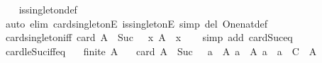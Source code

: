 \begin{isabellebody}
%
\isadelimproof
\ \ %
\endisadelimproof
%
\isatagproof
{}\isamarkupfalse%
\ is{\isacharunderscore}{\kern0pt}singleton{\isacharunderscore}{\kern0pt}def\isanewline
\ \ \isamarkupfalse%
\ {\isacharparenleft}{\kern0pt}auto\ elim{\isacharbang}{\kern0pt}{\isacharcolon}{\kern0pt}\ card{\isacharunderscore}{\kern0pt}{}{\isacharunderscore}{\kern0pt}singletonE\ is{\isacharunderscore}{\kern0pt}singletonE\ simp\ del{\isacharcolon}{\kern0pt}\ One{\isacharunderscore}{\kern0pt}nat{\isacharunderscore}{\kern0pt}def{\isacharparenright}{\kern0pt}%
\endisatagproof
{\isafoldproof}%
%
\isadelimproof
\isanewline
%
\endisadelimproof
\isanewline
{}\isamarkupfalse%
\ card{\isacharunderscore}{\kern0pt}{}{\isacharunderscore}{\kern0pt}singleton{\isacharunderscore}{\kern0pt}iff{\isacharcolon}{\kern0pt}\ {\isachardoublequoteopen}card\ A\ {\isacharequal}{\kern0pt}\ Suc\ {}\ {\isasymlongleftrightarrow}\ {\isacharparenleft}{\kern0pt}{\isasymexists}x{\isachardot}{\kern0pt}\ A\ {\isacharequal}{\kern0pt}\ {\isacharbraceleft}{\kern0pt}x{\isacharbraceright}{\kern0pt}{\isacharparenright}{\kern0pt}{\isachardoublequoteclose}\isanewline
%
\isadelimproof
\ \ %
\endisadelimproof
%
\isatagproof
{}\isamarkupfalse%
\ {\isacharparenleft}{\kern0pt}simp\ add{\isacharcolon}{\kern0pt}\ card{\isacharunderscore}{\kern0pt}Suc{\isacharunderscore}{\kern0pt}eq{\isacharparenright}{\kern0pt}%
\endisatagproof
{\isafoldproof}%
%
\isadelimproof
\isanewline
%
\endisadelimproof
\isanewline
{}\isamarkupfalse%
\ card{\isacharunderscore}{\kern0pt}le{\isacharunderscore}{\kern0pt}Suc{}{\isacharunderscore}{\kern0pt}iff{\isacharunderscore}{\kern0pt}eq{\isacharcolon}{\kern0pt}\isanewline
\ \ \ {\isachardoublequoteopen}finite\ A{\isachardoublequoteclose}\isanewline
\ \ \ {\isachardoublequoteopen}card\ A\ {\isasymle}\ Suc\ {}\ {\isasymlongleftrightarrow}\ {\isacharparenleft}{\kern0pt}{\isasymforall}a{}\ {\isasymin}\ A{\isachardot}{\kern0pt}\ {\isasymforall}a{}\ {\isasymin}\ A{\isachardot}{\kern0pt}\ a{}\ {\isacharequal}{\kern0pt}\ a{}{\isacharparenright}{\kern0pt}{\isachardoublequoteclose}\ {\isacharparenleft}{\kern0pt}\ {\isachardoublequoteopen}{\isacharquery}{\kern0pt}C\ {\isacharequal}{\kern0pt}\ {\isacharquery}{\kern0pt}A{\isachardoublequoteclose}{\isacharparenright}{\kern0pt}\isanewline
%
\isadelimproof
%
\endisadelimproof
%
\isatagproof
{}\isamarkupfalse%
\isanewline
\ \ \isamarkupfalse%

\end{isabellebody}
